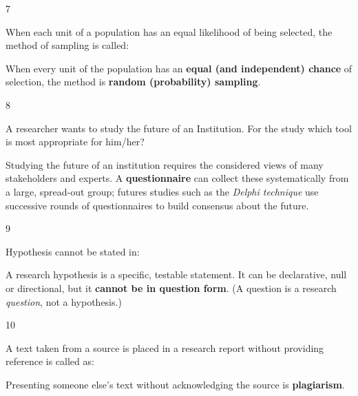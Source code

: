 \begin{question}{7}
{When each unit of a population has an equal likelihood of being selected, the method of sampling is called:\par}
\begin{explain}
When every unit of the population has an \textbf{equal (and independent) chance} of selection, the method is \textbf{random (probability) sampling}.
\end{explain}
\end{question}

\begin{question}{8}
{A researcher wants to study the future of an Institution. For the study which tool is most appropriate for him/her?\par}
\begin{explain}
Studying the future of an institution requires the considered views of many stakeholders and experts. A \textbf{questionnaire} can collect these systematically from a large, spread-out group; futures studies such as the \emph{Delphi technique} use successive rounds of questionnaires to build consensus about the future.
\end{explain}
\end{question}

\begin{question}{9}
{Hypothesis cannot be stated in:\par}
\begin{explain}
A research hypothesis is a specific, testable statement. It can be declarative, null or directional, but it \textbf{cannot be in question form}. (A question is a research \emph{question}, not a hypothesis.)
\end{explain}
\end{question}

\begin{question}{10}
{A text taken from a source is placed in a research report without providing reference is called as:\par}
\begin{explain}
Presenting someone else's text without acknowledging the source is \textbf{plagiarism}.
\end{explain}
\end{question}

